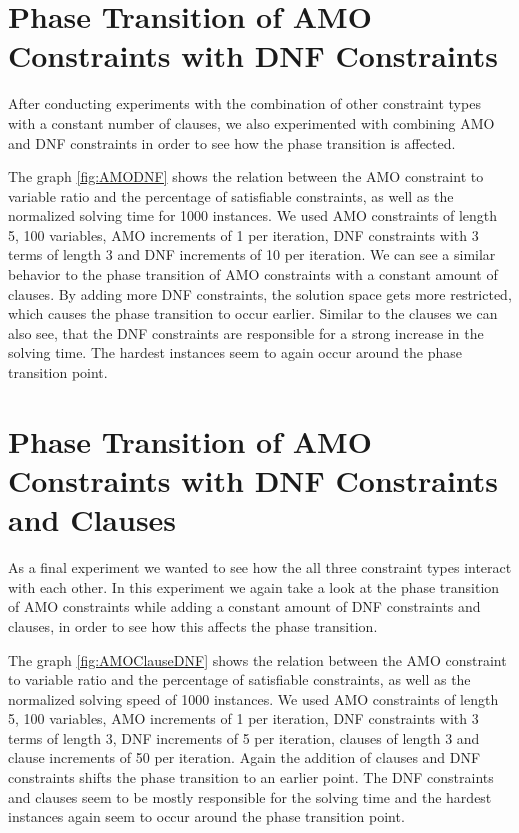 \section{Phase Transition of AMO Constraints with DNF Constraints}

After conducting experiments with the combination of other constraint types with a constant number of clauses, we also experimented with combining AMO and DNF constraints in order to see how the phase transition is affected.



The graph \ref{fig:AMODNF} shows the relation between the AMO constraint to variable ratio and the percentage of satisfiable constraints, as well as the normalized solving time for 1000 instances. We used AMO constraints of length 5, 100 variables, AMO increments of 1 per iteration, DNF constraints with 3 terms of length 3 and DNF increments of 10 per iteration. We can see a similar behavior to the phase transition of AMO constraints with a constant amount of clauses. By adding more DNF constraints, the solution space gets more restricted, which causes the phase transition to occur earlier. Similar to the clauses we can also see, that the DNF constraints are responsible for a strong increase in the solving time. The hardest instances seem to again occur around the phase transition point.

\section{Phase Transition of AMO Constraints with DNF Constraints and Clauses}

As a final experiment we wanted to see how the all three constraint types interact with each other. In this experiment we again take a look at the phase transition of AMO constraints while adding a constant amount of DNF constraints and clauses, in order to see how this affects the phase transition.




The graph \ref{fig:AMOClauseDNF} shows the relation between the AMO constraint to variable ratio and the percentage of satisfiable constraints, as well as the normalized solving speed of 1000 instances. We used AMO constraints of length 5, 100 variables, AMO increments of 1 per iteration, DNF constraints with 3 terms of length 3, DNF increments of 5 per iteration, clauses of length 3 and clause increments of 50 per iteration. Again the addition of clauses and DNF constraints shifts the phase transition to an earlier point. The DNF constraints and clauses seem to be mostly responsible for the solving time and the hardest instances again seem to occur around the phase transition point.

